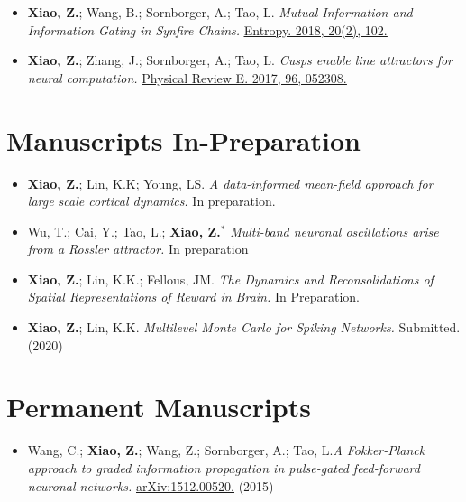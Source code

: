 \documentclass[margin, 11pt]{res} %
\begin{document}
\begin{resume}
\begin{itemize}
\item \textbf{Xiao, Z.}; Wang, B.; Sornborger, A.; Tao, L. \textit{Mutual Information and Information Gating in Synfire Chains.} \href{https://www.mdpi.com/1099-4300/20/2/102}{\underline{Entropy. 2018, 20(2), 102.}}

\item \textbf{Xiao, Z.}; Zhang, J.; Sornborger, A.; Tao, L. \textit{Cusps enable line attractors for neural computation.} \href{https://journals.aps.org/pre/abstract/10.1103/PhysRevE.96.052308}{\underline{Physical Review E. 2017, 96, 052308.}}

\end{itemize}


\medskip
\section{Manuscripts In-Preparation}
\label{Manuscripts}
\begin{itemize}
\item \textbf{Xiao, Z.}; Lin, K.K; Young, LS. \textit{A data-informed mean-field approach for large scale cortical dynamics.} In preparation. 

\item Wu, T.; Cai, Y.; Tao, L.; \textbf{Xiao, Z.$^*$} \textit{Multi-band neuronal oscillations arise from a Rossler attractor.} In preparation

\item \textbf{Xiao, Z.}; Lin, K.K.; Fellous, JM. \textit{The Dynamics and Reconsolidations of Spatial Representations of Reward in Brain.} In Preparation.


\item \textbf{Xiao, Z.}; Lin, K.K. \textit{Multilevel Monte Carlo for Spiking Networks.} Submitted. (2020)

\end{itemize}

\section{Permanent Manuscripts}
\begin{itemize}
    \item Wang, C.; \textbf{Xiao, Z.}; Wang, Z.; Sornborger, A.; Tao, L.\textit{A Fokker-Planck approach to graded information propagation in pulse-gated feed-forward neuronal networks.}  \href{https://arxiv.org/abs/1512.00520}{\underline{arXiv:1512.00520.}} (2015)
\end{itemize}


\end{resume}
\end{document}
